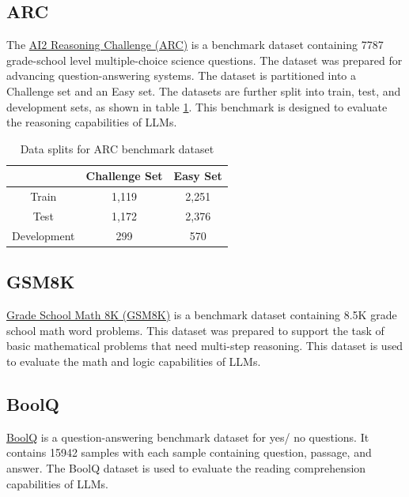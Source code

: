 \subsection{ARC} \label{arc}
The \href{https://allenai.org/data/arc}{AI2 Reasoning Challenge (ARC)} \cite{clark2018think} is a benchmark dataset containing 7787 grade-school level multiple-choice science questions. The dataset was prepared for advancing question-answering systems. The dataset is partitioned into a Challenge set and an Easy set. The datasets are further split into train, test, and development sets, as shown in table \ref{tab:arc}. This benchmark is designed to evaluate the reasoning capabilities of LLMs.

\begin{table}
\centering
\caption{Data splits for ARC benchmark dataset}
\label{tab:arc}
\begin{tabular}{|c|c|c|} \hline
 & Challenge Set & Easy Set \\ \hline
Train & 1,119 & 2,251 \\ \hline
Test & 1,172 & 2,376 \\ \hline
Development & 299 & 570 \\ \hline
\end{tabular}
\end{table}

\subsection{GSM8K} \label{gsm8k}
\href{https://huggingface.co/datasets/openai/gsm8k}{Grade School Math 8K (GSM8K)} \cite{zhang2024careful} is a benchmark dataset containing 8.5K grade school math word problems. This dataset was prepared to support the task of basic mathematical problems that need multi-step reasoning. This dataset is used to
evaluate the math and logic capabilities of LLMs.

\subsection{BoolQ} \label{boolq}
\href{https://huggingface.co/datasets/google/boolq}{BoolQ} \cite{clark2019boolq} is a question-answering benchmark dataset for yes/ no questions. It contains 15942 samples with each sample containing question, passage, and answer. The BoolQ dataset is used to evaluate the reading comprehension capabilities of LLMs.





